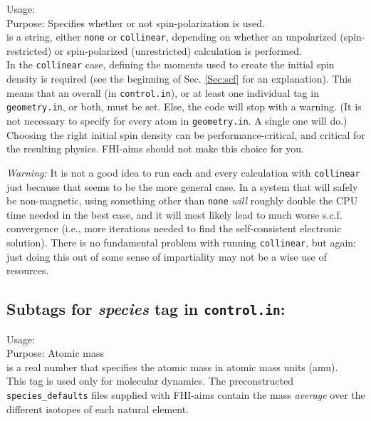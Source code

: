 {
 \noindent
 Usage:   \\[1.0ex]
 Purpose: Specifies whether or not spin-polarization is used. \\[1.0ex]
  is a string, either \texttt{none} or
 \texttt{collinear}, depending on whether an unpolarized (spin-restricted) or
 spin-polarized (unrestricted) calculation is performed. \\
}
In the \texttt{collinear} case, defining the moments used to create the
initial spin density is required (see the beginning of Sec. \ref{Sec:scf} for
an explanation). This means that an overall 
(in \texttt{control.in}), or at least one individual 
tag in \texttt{geometry.in}, or both, must be set. Else, the code will stop
with a warning. (It is not necessary to specify  for
every atom in \texttt{geometry.in}. A single one will do.) Choosing the right
initial spin density can be performance-critical, and critical for the
resulting physics. FHI-aims should not make this choice for you.

\emph{Warning:} It is not a good idea to run each and every calculation
with  \texttt{collinear} just because that seems to be
the more general case. In a system that will safely be non-magnetic,
using something other than  \texttt{none} \emph{will}
roughly double the CPU time needed in the best case, and it will most
likely lead to much worse s.c.f. convergence (i.e., more iterations
needed to find the self-consistent electronic solution). There is no
fundamental problem with running  \texttt{collinear}, but
again: just doing this out of some sense of impartiality may not be a
wise use of resources.

\newpage

\subsection*{Subtags for \emph{species} tag in \texttt{control.in}:}

{
  \noindent
  Usage:   \\[1.0ex]
  Purpose: Atomic mass\\[1.0ex]
   is a real number that specifies the atomic mass in atomic
  mass units (amu).\\
}
This tag is used only for molecular dynamics. The preconstructed
\texttt{species\_defaults} files supplied with FHI-aims contain
the mass \emph{average} over the different isotopes of each natural
element. 

